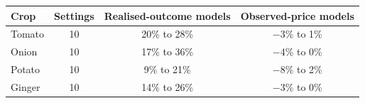 \renewcommand{\arraystretch}{1.25}
\footnotesize
\begin{tabular}{|l|c|c|c|}
\hline
\textbf{Crop} & \textbf{Settings} & \textbf{Realised-outcome models} & \textbf{Observed-price models} \\
\hline
Tomato & 10 & 20\% to 28\% & $-$3\% to 1\% \\
\hline
Onion & 10 & 17\% to 36\% & $-$4\% to 0\% \\
\hline
Potato & 10 & 9\% to 21\% & $-$8\% to 2\% \\
\hline
Ginger & 10 & 14\% to 26\% & $-$3\% to 0\% \\
\hline
\end{tabular}
